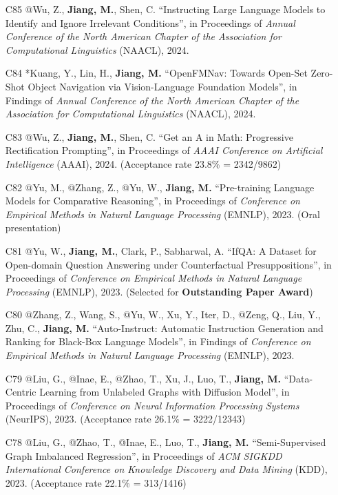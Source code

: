 \documentclass[10pt]{article}
\newenvironment{myindentpar}[1]%
{\begin{list}{}%
         {\setlength{\leftmargin}{#1}}%
         \item[]%
}
{\end{list}}
\newcounter{list}
\begin{document}
\begin{myindentpar}{0.00cm}
\begin{enumerate}[leftmargin=.5cm]
\item[C85] @Wu, Z., \textbf{Jiang, M.}, Shen, C. ``Instructing Large Language Models to Identify and Ignore Irrelevant Conditions'', in Proceedings of \textit{Annual Conference of the North American Chapter of the Association for Computational Linguistics} (NAACL), 2024.

\item[C84] *Kuang, Y., Lin, H., \textbf{Jiang, M.} ``OpenFMNav: Towards Open-Set Zero-Shot Object Navigation via Vision-Language Foundation Models'', in Findings of \textit{Annual Conference of the North American Chapter of the Association for Computational Linguistics} (NAACL), 2024.

\item[C83] @Wu, Z., \textbf{Jiang, M.}, Shen, C. ``Get an A in Math: Progressive Rectification Prompting'', in Proceedings of \textit{AAAI Conference on Artificial Intelligence} (AAAI), 2024. (Acceptance rate 23.8\% = 2342/9862)
		
\item[C82] @Yu, M., @Zhang, Z., @Yu, W., \textbf{Jiang, M.} ``Pre-training Language Models for Comparative Reasoning'', in Proceedings of \textit{Conference on Empirical Methods in Natural Language Processing} (EMNLP), 2023. (Oral presentation)

\item[C81] @Yu, W., \textbf{Jiang, M.}, Clark, P., Sabharwal, A. ``IfQA: A Dataset for Open-domain Question Answering under Counterfactual Presuppositions'', in Proceedings of \textit{Conference on Empirical Methods in Natural Language Processing} (EMNLP), 2023. (Selected for \textbf{Outstanding Paper Award})

\item[C80] @Zhang, Z., Wang, S., @Yu, W., Xu, Y., Iter, D., @Zeng, Q., Liu, Y., Zhu, C., \textbf{Jiang, M.} ``Auto-Instruct: Automatic Instruction Generation and Ranking for Black-Box Language Models'', in Findings of \textit{Conference on Empirical Methods in Natural Language Processing} (EMNLP), 2023.

\item[C79] @Liu, G., @Inae, E., @Zhao, T., Xu, J., Luo, T., \textbf{Jiang, M.} ``Data-Centric Learning from Unlabeled Graphs with Diffusion Model'', in Proceedings of \textit{Conference on Neural Information Processing Systems} (NeurIPS), 2023. (Acceptance rate 26.1\% = 3222/12343)

\item[C78] @Liu, G., @Zhao, T., @Inae, E., Luo, T., \textbf{Jiang, M.} ``Semi-Supervised Graph Imbalanced Regression'', in Proceedings of \textit{ACM SIGKDD International Conference on Knowledge Discovery and Data Mining} (KDD), 2023. (Acceptance rate 22.1\% = 313/1416)
		

\end{enumerate}
\end{myindentpar}
\end{document}
